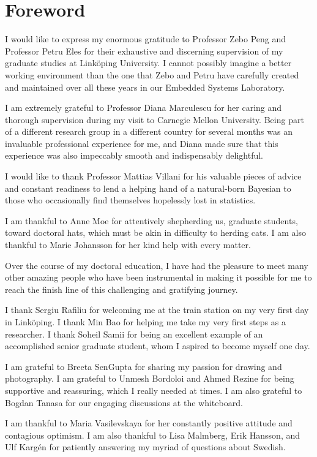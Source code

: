 \chapter*{Foreword}

I would like to express my enormous gratitude to Professor Zebo Peng and
Professor Petru Eles for their exhaustive and discerning supervision of my
graduate studies at Linköping University. I cannot possibly imagine a better
working environment than the one that Zebo and Petru have carefully created and
maintained over all these years in our Embedded Systems Laboratory.

I am extremely grateful to Professor Diana Marculescu for her caring and
thorough supervision during my visit to Carnegie Mellon University. Being part
of a different research group in a different country for several months was an
invaluable professional experience for me, and Diana made sure that this
experience was also impeccably smooth and indispensably delightful.

I would like to thank Professor Mattias Villani for his valuable pieces of
advice and constant readiness to lend a helping hand of a natural-born Bayesian
to those who occasionally find themselves hopelessly lost in statistics.

I am thankful to Anne Moe for attentively shepherding us, graduate students,
toward doctoral hats, which must be akin in difficulty to herding cats. I am
also thankful to Marie Johansson for her kind help with every matter.

Over the course of my doctoral education, I have had the pleasure to meet many
other amazing people who have been instrumental in making it possible for me to
reach the finish line of this challenging and gratifying journey.

I thank Sergiu Rafiliu for welcoming me at the train station on my very first
day in Linköping. I thank Min Bao for helping me take my very first steps as a
researcher. I thank Soheil Samii for being an excellent example of an
accomplished senior graduate student, whom I aspired to become myself one day.

I am grateful to Breeta SenGupta for sharing my passion for drawing and
photography. I am grateful to Unmesh Bordoloi and Ahmed Rezine for being
supportive and reassuring, which I really needed at times. I am also grateful to
Bogdan Tanasa for our engaging discussions at the whiteboard.

I am thankful to Maria Vasilevskaya for her constantly positive attitude and
contagious optimism. I am also thankful to Lisa Malmberg, Erik Hansson, and Ulf
Kargén for patiently answering my myriad of questions about Swedish.

